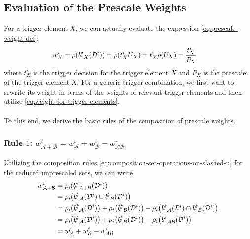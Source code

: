 \subsection{Evaluation of the Prescale Weights}
For a trigger element $X$, we can actually evaluate the expression \eqref{eq:prescale-weight-def}:
\begin{align}
\label{eq:weight-for-trigger-elements}
    w_X^i&=\rho(\slashed{U}_X(\mathcal{D}^i))=\rho(t_X^iU_X)=t^i_X\rho(U_X)=\frac{t^i_X}{P_X}
\end{align}
where $t^i_X$ is the trigger decision for the trigger element $X$ and $P_X$ is the prescale of the trigger element $X$. For a generic trigger combination, we first want to rewrite its weight in terms of the weights of relevant trigger elements and then utilize \eqref{eq:weight-for-trigger-elements}. 
\\\\
To this end, we derive the basic rules of the composition of prescale weights. %
\subsubsection*{Rule $1$: $w^i_{\mathcal{A}+\mathcal{B}}=w^i_{\mathcal{A}}+w^i_{\mathcal{B}}-w^i_{\mathcal{AB}}$}
Utilizing the composition rules \eqref{eq:composition-set-operations-on-slashed-u} for the reduced unprescaled sets, we can write 
\begin{subequations}
\label{eq:sum-general}
\begin{align}
    w^i_{\mathcal{A}+\mathcal{B}}&=\rho_i(\slashed{U}_{\mathcal{A}+\mathcal{B}}(\mathcal{D}^i))\\
    &=\rho_i\big(\slashed{U}_{\mathcal{A}}(\mathcal{D}^i)\cup \slashed{U}_{\mathcal{B}}(\mathcal{D}^i)\big)\\
    &=\rho_i\big(\slashed{U}_{\mathcal{A}}(\mathcal{D}^i)\big)+\rho_i\big(\slashed{U}_{\mathcal{B}}(\mathcal{D}^i)\big)-\rho_i\big(\slashed{U}_{\mathcal{A}}(\mathcal{D}^i)\cap \slashed{U}_{\mathcal{B}}(\mathcal{D}^i)\big)\\
    &=\rho_i\big(\slashed{U}_{\mathcal{A}}(\mathcal{D}^i)\big)+\rho_i\big(\slashed{U}_{\mathcal{B}}(\mathcal{D}^i)\big)-\rho_i\big(\slashed{U}_{\mathcal{A}\mathcal{B}}(\mathcal{D}^i)\big)\\
    &=w^i_{\mathcal{A}}+w^i_{\mathcal{B}}-w^i_{\mathcal{AB}}
\end{align}
\end{subequations}
